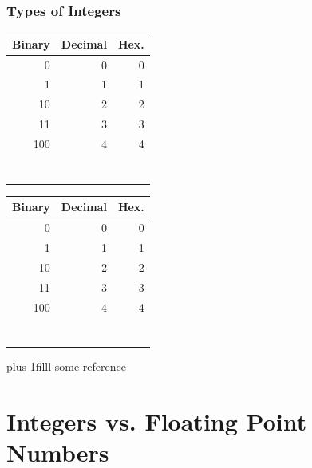 \documentclass[fleqn]{beamer} %
\newcommand{\sectiontitleII}{Types of Integers}
\newcommand{\sectiontitleIII}{Integers vs. Floating Point Numbers}
\newcommand{\btVFill}{\vskip0pt plus 1filll}
\begin{document}
\begin{frame}[label=sectionII] \small
\frametitle{\sectiontitleII}
\bigskip

\begin{multicols}{2}
\begin{tabular}{|r|r|r|} \hline
	Binary 	& Decimal 	& Hex. \\ \hline
	0		& 0			& 0 		\\ \hline	
	1		& 1			& 1 		\\ \hline
	10		& 2			& 2 		\\ \hline
	11		& 3			& 3 		\\ \hline
	100		& 4			& 4 		\\ \hline
	& 			&  		\\ \hline
	& 			&  		\\ \hline
	& 			&  		\\ \hline
	& 			&  		\\ \hline
	& 			&  		\\ \hline
	& 		&  		\\ \hline
	& 		&  		\\ \hline
\end{tabular}

\begin{tabular}{|r|r|r|} \hline
	Binary\hspace{18mm} 	& Decimal 	& Hex. \\ \hline
	0		& 0			& 0 		\\ \hline	
	1		& 1			& 1 		\\ \hline
	10		& 2			& 2 		\\ \hline
	11		& 3			& 3 		\\ \hline
	100		& 4			& 4 		\\ \hline
	& 			&  		\\ \hline
	& 			&  		\\ \hline
	& 			&  		\\ \hline
	& 			&  		\\ \hline
	& 			&  		\\ \hline
	& 		&  		\\ \hline
	& 		&  		\\ \hline
\end{tabular}
\end{multicols}

\btVFill
\tiny{some reference}	
\end{frame}


\section{\sectiontitleIII}
\end{document}

